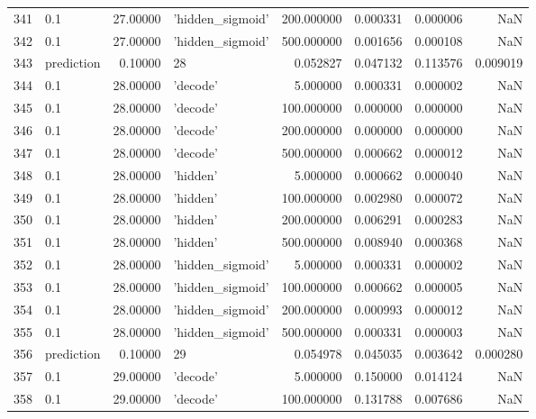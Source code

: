 \documentclass[10pt,a4paper]{article}
\begin{document}
\begin{tabular}{llrlrrrr}
341  &         0.1 &  27.00000 &   'hidden\_sigmoid' &  200.000000 &  0.000331 &  0.000006 &       NaN \\
342  &         0.1 &  27.00000 &   'hidden\_sigmoid' &  500.000000 &  0.001656 &  0.000108 &       NaN \\
343  &  prediction &   0.10000 &                 28 &    0.052827 &  0.047132 &  0.113576 &  0.009019 \\
344  &         0.1 &  28.00000 &           'decode' &    5.000000 &  0.000331 &  0.000002 &       NaN \\
345  &         0.1 &  28.00000 &           'decode' &  100.000000 &  0.000000 &  0.000000 &       NaN \\
346  &         0.1 &  28.00000 &           'decode' &  200.000000 &  0.000000 &  0.000000 &       NaN \\
347  &         0.1 &  28.00000 &           'decode' &  500.000000 &  0.000662 &  0.000012 &       NaN \\
348  &         0.1 &  28.00000 &           'hidden' &    5.000000 &  0.000662 &  0.000040 &       NaN \\
349  &         0.1 &  28.00000 &           'hidden' &  100.000000 &  0.002980 &  0.000072 &       NaN \\
350  &         0.1 &  28.00000 &           'hidden' &  200.000000 &  0.006291 &  0.000283 &       NaN \\
351  &         0.1 &  28.00000 &           'hidden' &  500.000000 &  0.008940 &  0.000368 &       NaN \\
352  &         0.1 &  28.00000 &   'hidden\_sigmoid' &    5.000000 &  0.000331 &  0.000002 &       NaN \\
353  &         0.1 &  28.00000 &   'hidden\_sigmoid' &  100.000000 &  0.000662 &  0.000005 &       NaN \\
354  &         0.1 &  28.00000 &   'hidden\_sigmoid' &  200.000000 &  0.000993 &  0.000012 &       NaN \\
355  &         0.1 &  28.00000 &   'hidden\_sigmoid' &  500.000000 &  0.000331 &  0.000003 &       NaN \\
356  &  prediction &   0.10000 &                 29 &    0.054978 &  0.045035 &  0.003642 &  0.000280 \\
357  &         0.1 &  29.00000 &           'decode' &    5.000000 &  0.150000 &  0.014124 &       NaN \\
358  &         0.1 &  29.00000 &           'decode' &  100.000000 &  0.131788 &  0.007686 &       NaN \\

\end{tabular}
\end{document}

